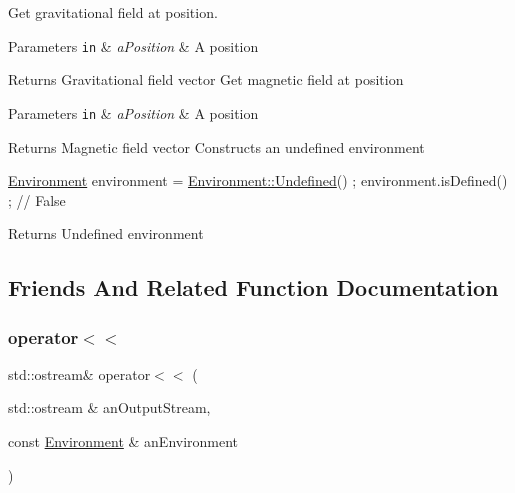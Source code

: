Get gravitational field at position. 


\begin{DoxyParams}[1]{Parameters}
\mbox{\tt in}  & {\em a\+Position} & A position \\
\hline
\end{DoxyParams}
\begin{DoxyReturn}{Returns}
Gravitational field vector Get magnetic field at position
\end{DoxyReturn}

\begin{DoxyParams}[1]{Parameters}
\mbox{\tt in}  & {\em a\+Position} & A position \\
\hline
\end{DoxyParams}
\begin{DoxyReturn}{Returns}
Magnetic field vector Constructs an undefined environment
\end{DoxyReturn}

\begin{DoxyCode}
\hyperlink{classlibrary_1_1physics_1_1_environment_a51854f130c31eb075ea623e332978495}{Environment} environment = \hyperlink{classlibrary_1_1physics_1_1_environment_a8d1dfff3867d59ecdebd3ee6e98a2dab}{Environment::Undefined}() ;
environment.isDefined() ; \textcolor{comment}{// False}
\end{DoxyCode}


\begin{DoxyReturn}{Returns}
Undefined environment 
\end{DoxyReturn}


\subsection{Friends And Related Function Documentation}
\mbox{\label{classlibrary_1_1physics_1_1_environment_a7bc4b39898452fbe5ce3a8de75ad2596}} 
\subsubsection{\texorpdfstring{operator$<$$<$}{operator<<}}
{\footnotesize\ttfamily std\+::ostream\& operator$<$$<$ (\begin{DoxyParamCaption}\item[{std\+::ostream \&}]{an\+Output\+Stream,  }\item[{const \hyperlink{classlibrary_1_1physics_1_1_environment}{Environment} \&}]{an\+Environment }\end{DoxyParamCaption})\hspace{0.3cm}{\ttfamily [friend]}}



